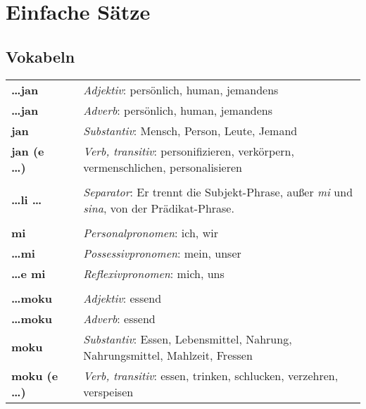 \section{Einfache Sätze}
\subsection*{Vokabeln}

\begin{supertabular}{p{2,5cm}|ll}
%
\textbf{\dots jan} && \textit{Adjektiv}: persönlich, human, jemandens \\ %
\textbf{\dots jan} && \textit{Adverb}: persönlich, human, jemandens \\ %
\textbf{jan} && \textit{Substantiv}: Mensch, Person, Leute, Jemand \\ %
\textbf{jan (e \dots)} && \textit{Verb, transitiv}: personifizieren, verkörpern, vermenschlichen, personalisieren \\ %
 && \\ %
%
\textbf{\dots li \dots} && \textit{Separator}: Er trennt die Subjekt-Phrase, außer \textit{mi} und \textit{sina}, von der Prädikat-Phrase. \\ %
 && \\ %
%
\textbf{mi} && \textit{Personalpronomen}: ich, wir  \\ 
\textbf{\dots mi} && \textit{Possessivpronomen}: mein, unser \\  
\textbf{\dots e mi} && \textit{Reflexivpronomen}: mich, uns  \\ 
 && \\ %
%
\textbf{\dots moku} && \textit{Adjektiv}: essend \\ %
\textbf{\dots moku} && \textit{Adverb}: essend \\ %
\textbf{moku} && \textit{Substantiv}: Essen, Lebensmittel, Nahrung, Nahrungsmittel, Mahlzeit, Fressen \\ %
\textbf{moku (e \dots)} && \textit{Verb, transitiv}: essen, trinken, schlucken, verzehren, verspeisen \\ %

\end{supertabular}
